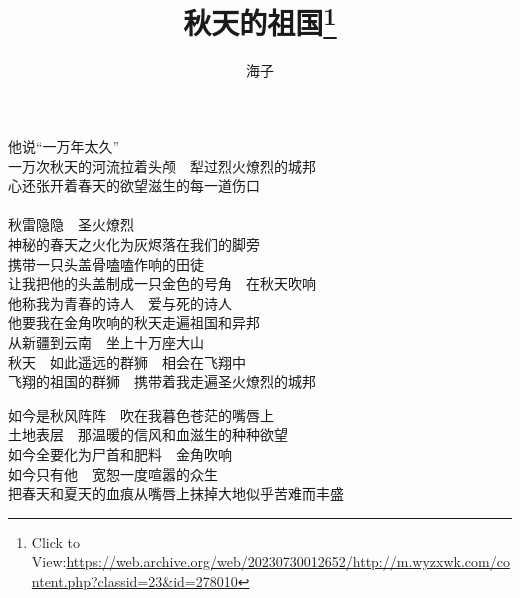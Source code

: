 \documentclass{article}
\title{秋天的祖国\footnote{Click to View:\url{https://web.archive.org/web/20230730012652/http://m.wyzxwk.com/content.php?classid=23&id=278010}}}
\author{海子}
\date{}
\begin{document}

\maketitle

\setlength\parindent{0pt}


\Large


﻿他说“一万年太久” \\ 


一万次秋天的河流拉着头颅　犁过烈火燎烈的城邦\\
心还张开着春天的欲望滋生的每一道伤口\\
　　\\
秋雷隐隐　圣火燎烈\\
神秘的春天之火化为灰烬落在我们的脚旁\\
携带一只头盖骨嗑嗑作响的田徒\\
让我把他的头盖制成一只金色的号角　在秋天吹响\\
他称我为青春的诗人　爱与死的诗人\\
他要我在金角吹响的秋天走遍祖国和异邦\\
从新疆到云南　坐上十万座大山\\
秋天　如此遥远的群狮　相会在飞翔中\\
飞翔的祖国的群狮　携带着我走遍圣火燎烈的城邦\\
\newpage

如今是秋风阵阵　吹在我暮色苍茫的嘴唇上\\
土地表层　那温暖的信风和血滋生的种种欲望\\
如今全要化为尸首和肥料　金角吹响\\
如今只有他　宽恕一度喧嚣的众生\\
把春天和夏天的血痕从嘴唇上抹掉大地似乎苦难而丰盛
\end{document}
